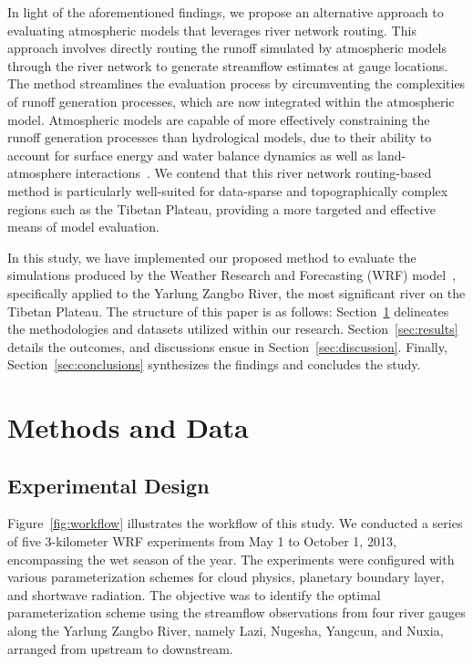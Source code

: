 \documentclass[draft]{agujournal2019}
\begin{document}
In light of the aforementioned findings, we propose an alternative approach to evaluating atmospheric models that leverages river network routing. This approach involves directly routing the runoff simulated by atmospheric models through the river network to generate streamflow estimates at gauge locations. The method streamlines the evaluation process by circumventing the complexities of runoff generation processes, which are now integrated within the atmospheric model. Atmospheric models are capable of more effectively constraining the runoff generation processes than hydrological models, due to their ability to account for surface energy and water balance dynamics as well as land-atmosphere interactions~\cite{wagner2016WRR, senatore2015JAMES}. We contend that this river network routing-based method is particularly well-suited for data-sparse and topographically complex regions such as the Tibetan Plateau, providing a more targeted and effective means of model evaluation.

In this study, we have implemented our proposed method to evaluate the simulations produced by the Weather Research and Forecasting (WRF) model~\cite{powers2017BAMS}, specifically applied to the Yarlung Zangbo River, the most significant river on the Tibetan Plateau. The structure of this paper is as follows: Section~\ref{sec:methods} delineates the methodologies and datasets utilized within our research. Section~\ref{sec:results} details the outcomes, and discussions ensue in Section~\ref{sec:discussion}. Finally, Section~\ref{sec:conclusions} synthesizes the findings and concludes the study.

\section{Methods and Data}
\label{sec:methods}

\subsection{Experimental Design}
\label{sec:design}

Figure~\ref{fig:workflow} illustrates the workflow of this study. We conducted a series of five 3-kilometer WRF experiments from May 1 to October 1, 2013, encompassing the wet season of the year. The experiments were configured with various parameterization schemes for cloud physics, planetary boundary layer, and shortwave radiation. The objective was to identify the optimal parameterization scheme using the streamflow observations from four river gauges along the Yarlung Zangbo River, namely Lazi, Nugesha, Yangcun, and Nuxia, arranged from upstream to downstream.
\end{document}
